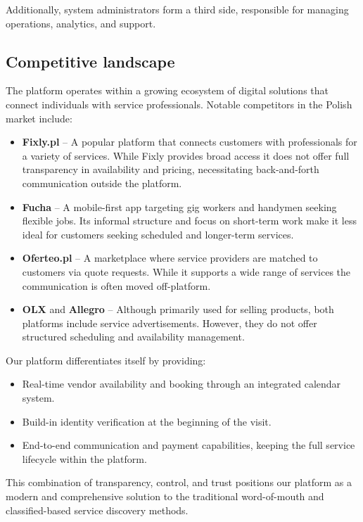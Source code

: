 \documentclass[11pt,a4paper]{article}
\begin{document}
Additionally, system administrators form a third side, responsible
for managing operations, analytics, and support.

\subsection{Competitive landscape}

The platform operates within a growing ecosystem of digital solutions
that connect individuals with service professionals. Notable
competitors in the Polish market include:

\begin{itemize}
  \item \textbf{Fixly.pl} – A popular platform that connects
    customers with professionals for a variety of services. While
    Fixly provides broad access it does not offer full transparency
    in availability and pricing, necessitating back-and-forth
    communication outside the platform.
  \item \textbf{Fucha} – A mobile-first app targeting gig workers and
    handymen seeking flexible jobs. Its informal structure and focus
    on short-term work make it less ideal for customers seeking
    scheduled and longer-term services.
  \item \textbf{Oferteo.pl} – A marketplace where service providers
    are matched to customers via quote requests. While it supports a
    wide range of services the communication is often moved off-platform.
  \item \textbf{OLX} and \textbf{Allegro} – Although primarily used
    for selling products, both platforms include service
    advertisements. However, they do not offer structured scheduling
    and availability management.
\end{itemize}

Our platform differentiates itself by providing:

\begin{itemize}
  \item Real-time vendor availability and booking through an
    integrated calendar system.
  \item Build-in identity verification at the beginning of the visit.
  \item End-to-end communication and payment capabilities, keeping
    the full service lifecycle within the platform.
\end{itemize}

This combination of transparency, control, and trust positions our
platform as a modern and comprehensive solution to the traditional
word-of-mouth and classified-based service discovery methods.
\end{document}
